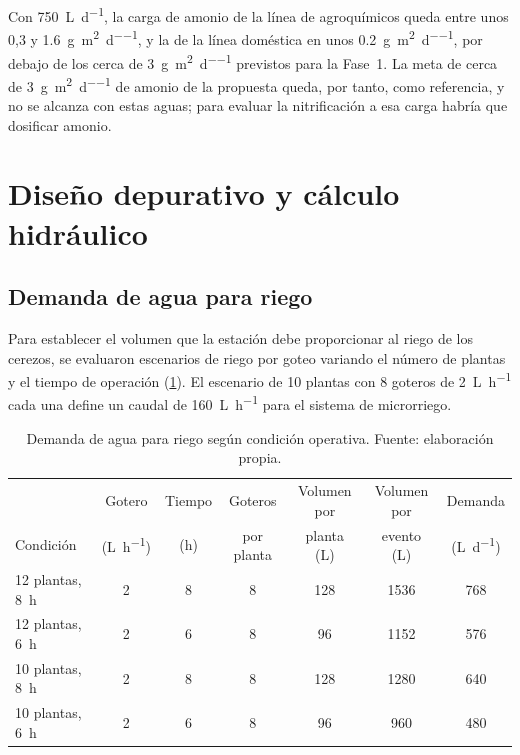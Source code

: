 Con \qty{750}{\liter\per\day}, la carga de amonio de la línea de agroquímicos queda entre unos 0,3 y \qty{1.6}{\gram\per\square\meter\per\day}, y la de la línea doméstica en unos \qty{0.2}{\gram\per\square\meter\per\day}, por debajo de los cerca de \qty{3}{\gram\per\square\meter\per\day} previstos para la Fase~1.
La meta de cerca de \qty{3}{\gram\per\square\meter\per\day} de amonio de la propuesta queda, por tanto, como referencia, y no se alcanza con estas aguas; para evaluar la nitrificación a esa carga habría que dosificar amonio.

\section{Diseño depurativo y cálculo hidráulico}
\label{sec:res-hidraulico}

\subsection{Demanda de agua para riego}

Para establecer el volumen que la estación debe proporcionar al riego de los cerezos, se evaluaron escenarios de riego por goteo variando el número de plantas y el tiempo de operación (\cref{tab:demanda-riego}).
El escenario de 10 plantas con 8 goteros de \qty{2}{\liter\per\hour} cada una define un caudal de \qty{160}{\liter\per\hour} para el sistema de microrriego.

\begin{table}[htbp]
  \centering
  \caption{Demanda de agua para riego según condición operativa. Fuente: elaboración propia.}
  \label{tab:demanda-riego}
  \begin{tabular}{@{}lcccccc@{}}
    \toprule
    & Gotero & Tiempo & Goteros & Volumen por & Volumen por & Demanda \\
    Condición & (\unit{\liter\per\hour}) & (\unit{\hour}) & por planta & planta (\unit{\liter}) & evento (\unit{\liter}) & (\unit{\liter\per\day}) \\
    \midrule
    12 plantas, 8~h & 2 & 8 & 8 & 128 & 1536 & 768 \\
    12 plantas, 6~h & 2 & 6 & 8 & 96 & 1152 & 576 \\
    10 plantas, 8~h & 2 & 8 & 8 & 128 & 1280 & 640 \\
    10 plantas, 6~h & 2 & 6 & 8 & 96 & 960 & 480 \\
    \bottomrule
  \end{tabular}
\end{table}


